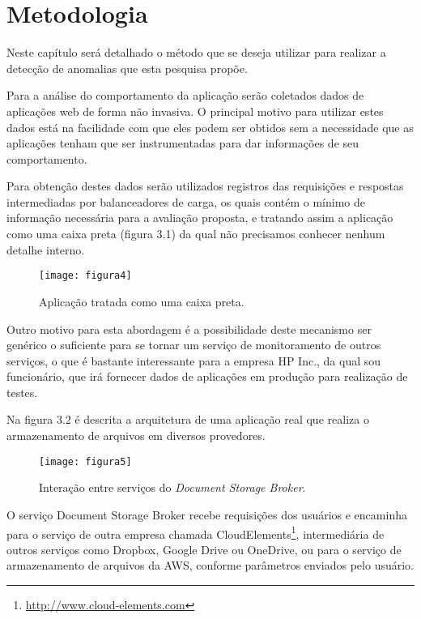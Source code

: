 
\chapter{Metodologia}
\label{cap:metodologia}

Neste capítulo será detalhado o método que se deseja utilizar para realizar a
detecção de anomalias que esta pesquisa propõe.

Para a análise do comportamento da aplicação serão coletados dados de aplicações
web de forma não invasiva. O principal motivo para utilizar estes dados está na
facilidade com que eles podem ser obtidos sem a necessidade que as aplicações
tenham que ser instrumentadas para dar informações de seu comportamento.

Para obtenção destes dados serão utilizados registros das requisições e respostas
intermediadas por balanceadores de carga, os quais contém o mínimo de informação
necessária para a avaliação proposta, e tratando assim a aplicação como uma caixa
preta (figura 3.1) da qual não precisamos conhecer nenhum detalhe interno.

\begin{figure}
  \centering
  \texttt{[image: figura4]}
  \caption{Aplicação tratada como uma caixa preta.\label{fig:aplicacao-tratada-como-uma-caixa-preta}}
\end{figure}

Outro motivo para esta abordagem é a possibilidade deste mecanismo ser genérico o
suficiente para se tornar um serviço de monitoramento de outros serviços, o que é
bastante interessante para a empresa HP Inc., da qual sou funcionário, que irá
fornecer dados de aplicações em produção para realização de testes.


Na figura 3.2 é descrita a arquitetura de uma aplicação real que realiza o
armazenamento de arquivos em diversos provedores.

\begin{figure}
  \centering
  \texttt{[image: figura5]}
  \caption{Interação entre serviços do \textit{Document Storage Broker}.\label{fig:document-storage-broker}}
\end{figure}

O serviço Document Storage Broker recebe requisições dos usuários e encaminha para
o serviço de outra empresa chamada CloudElements\footnote[7]{\url{http://www.cloud-elements.com}},
intermediária de outros serviços como Dropbox, Google Drive ou OneDrive, ou para o
serviço de armazenamento de arquivos da AWS, conforme parâmetros enviados pelo
usuário.

